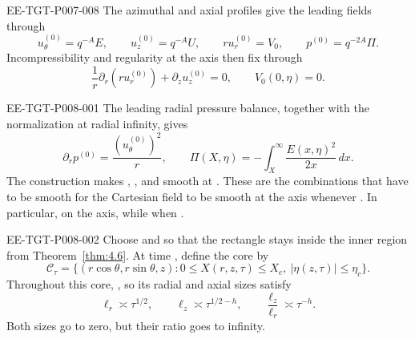 \begin{EESegment}{EE-TGT-P007-008}
The azimuthal and axial profiles  give the leading fields
through
\[
 u_\theta^{(0)}=q^{-A}E,\qquad u_z^{(0)}=q^{-A}U,
 \qquad
 ru_r^{(0)}=V_0,\qquad p^{(0)}=q^{-2A}\Pi.
\]
Incompressibility and regularity at the axis then fix  through
\[
 \frac1r\partial_r(ru_r^{(0)})+\partial_z u_z^{(0)}=0,
 \qquad V_0(0,\eta)=0.
\]
\end{EESegment}
%
\begin{EESegment}{EE-TGT-P008-001}
The leading radial pressure balance, together with the normalization at radial infinity, gives
\[
 \partial_r p^{(0)}=\frac{(u_\theta^{(0)})^2}{r},
 \qquad
 \Pi(X,\eta)=-\int_X^\infty\frac{E(x,\eta)^2}{2x}\,dx.
\]
The construction makes ,
, and  smooth at
. These are the combinations that have to be smooth for the Cartesian
field to be smooth at the axis whenever . In particular,
 on the axis, while
 when .
\end{EESegment}

\begin{EESegment}{EE-TGT-P008-002}
Choose  and  so that the rectangle
 stays inside the inner region from
Theorem~\ref{thm:4.6}. At time , define the core by
\[
 \mathcal C_\tau=\{(r\cos\theta,r\sin\theta,z):0\leq X(r,z,\tau)\leq X_c,
 \ |\eta(z,\tau)|\leq\eta_c\}.
\]
Throughout this core, , so its radial and axial sizes satisfy
\[
 \ell_r\asymp\tau^{1/2},\qquad
 \ell_z\asymp\tau^{1/2-h},\qquad
 \frac{\ell_z}{\ell_r}\asymp\tau^{-h}.
\]
Both sizes go to zero, but their ratio goes to infinity.
\end{EESegment}

